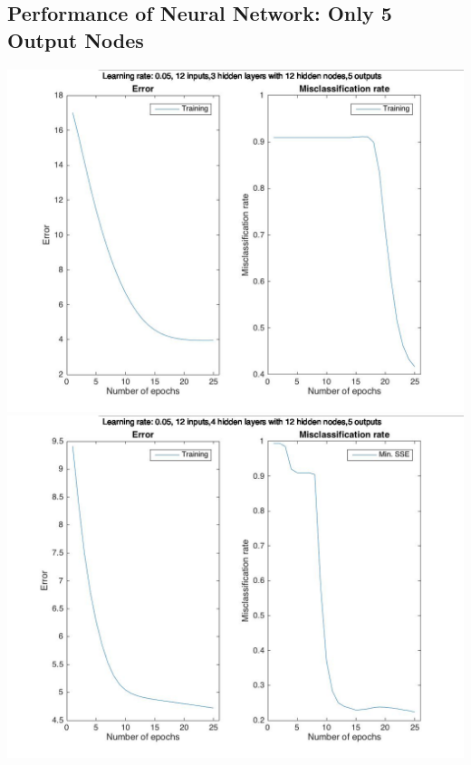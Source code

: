 \documentclass[12pt]{article}
\begin{document}
\subsection{Performance of Neural Network: Only 5 Output Nodes}
\label{subsec:annBetterPerformance}
\includegraphics[scale=0.37]{images/ann/slightlyBetterWithTop5Genres1}
\newline
\includegraphics[scale=0.37]{images/ann/slightlyBetterWithTop5Genres2}
\end{document}
